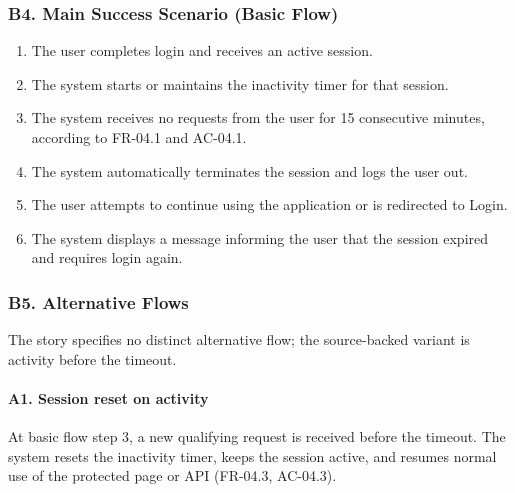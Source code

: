 \documentclass[12pt]{article}
\begin{document}
\hypertarget{sec:b4-main-success-scenario-basic-flow}{}
\subsubsection*{B4. Main Success Scenario (Basic Flow)}
\par\medskip

\begin{enumerate}
\item The user completes login and receives an active session.
\item The system starts or maintains the inactivity timer for that session.
\item The system receives no requests from the user for 15 consecutive minutes, according to FR-04.1 and AC-04.1.
\item The system automatically terminates the session and logs the user out.
\item The user attempts to continue using the application or is redirected to Login.
\item The system displays a message informing the user that the session expired and requires login again.
\end{enumerate}
\par\medskip

\hypertarget{sec:b5-alternative-flows}{}
\subsubsection*{B5. Alternative Flows}
\par\medskip

The story specifies no distinct alternative flow; the source-backed variant is activity before the timeout.
\par\medskip

\hypertarget{sec:a1-session-reset-on-activity}{}
\paragraph*{A1. Session reset on activity}
\par\medskip

At basic flow step 3, a new qualifying request is received before the timeout. The system resets the inactivity timer, keeps the session active, and resumes normal use of the protected page or API (FR-04.3, AC-04.3).
\par\medskip
\end{document}
